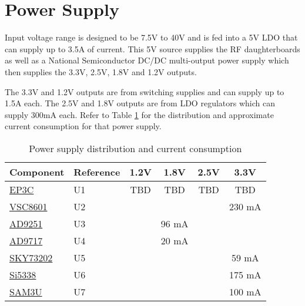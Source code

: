 \section{Power Supply} %
\label{sec:power}
    Input voltage range is designed to be 7.5V to 40V and is fed into a 5V LDO that can supply up to 
    3.5A of current.  This 5V source supplies the RF daughterboards as well as a National Semiconductor
    DC/DC multi-output power supply which then supplies the 3.3V, 2.5V, 1.8V and 1.2V outputs.
    
    The 3.3V and 1.2V outputs are from switching supplies and can supply up to 1.5A each.  The 2.5V and 1.8V
    outputs are from LDO regulators which can supply 300mA each.  Refer to Table \ref{table:currentconsumption} for 
    the distribution and approximate current consumption for that power supply.
    
    \begin{table}[here]
        \begin{center}
            \begin{tabular}{|l|l|c|c|c|c|}
                \hline
                Component   & Reference             & 1.2V      & 1.8V      & 2.5V      & 3.3V      \\ \hline 
                \hline
                \hyperref[sec:fpga]{EP3C}           & U1        & TBD       & TBD       & TBD       & TBD       \\ \hline
                \hyperref[sec:gige]{VSC8601}        & U2        & \-        & \-        & \-        & 230 mA    \\ \hline
                \hyperref[sec:adc]{AD9251}          & U3        & \-        & 96 mA     & \-        & \-        \\ \hline
                \hyperref[sec:dac]{AD9717}          & U4        & \-        & 20 mA     & \-        & \-        \\ \hline
                \hyperref[sec:dac-lpf]{SKY73202}    & U5        & \-        & \-        & \-        & 59 mA     \\ \hline
                \hyperref[sec:clock]{Si5338}        & U6        & \-        & \-        & \-        & 175 mA    \\ \hline
                \hyperref[sec:sam3u]{SAM3U}         & U7        & \-        & \-        & \-        & 100 mA    \\ \hline 
            \end{tabular}
            \caption{Power supply distribution and current consumption}
            \label{table:currentconsumption}
        \end{center}
    \end{table}
    
